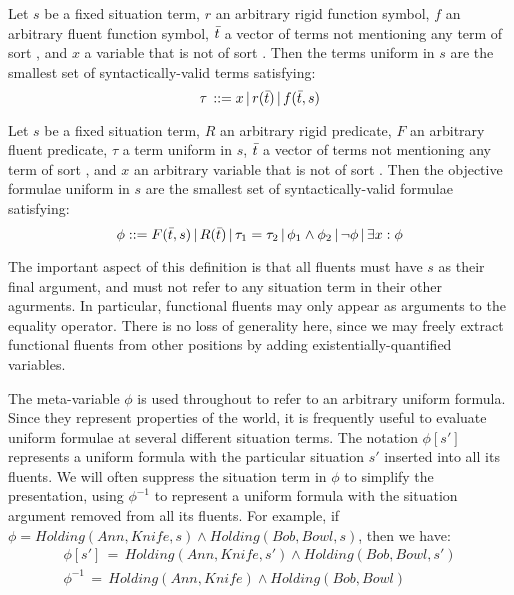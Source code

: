 \begin{defnL}
 Let $s$ be a fixed situation term, $r$
an arbitrary rigid function symbol, $f$ an arbitrary fluent function
symbol, $\bar{t}$ a vector of terms not mentioning any term of sort
, and $x$ a variable that is not of sort .
Then the terms uniform in $s$ are the smallest set of syntactically-valid
terms satisfying:\[
\tau\,::=x\,|\, r(\bar{t})\,|\, f(\bar{t},s)\]

\begin{defnL}
 Let $s$ be a fixed situation
term, $R$ an arbitrary rigid predicate, $F$ an arbitrary fluent
predicate, $\tau$ a term uniform in $s$, $\bar{t}$ a vector of
terms not mentioning any term of sort , and $x$ an
arbitrary variable that is not of sort . Then the
objective formulae uniform in $s$ are the smallest set of syntactically-valid
formulae satisfying:\[
\phi::=F(\bar{t},s)\,|\, R(\bar{t})\,|\,\tau_{1}=\tau_{2}\,|\,\phi_{1}\wedge\phi_{2}\,|\,\neg\phi\,|\,\exists x:\phi\]

\end{defnL}
\end{defnL}
The important aspect of this definition is that all fluents must have
$s$ as their final argument, and must not refer to any situation
term in their other agurments. In particular, functional fluents may
only appear as arguments to the equality operator. There is no loss
of generality here, since we may freely extract functional fluents
from other positions by adding existentially-quantified variables.

The meta-variable $\phi$ is used throughout to refer to an arbitrary
uniform formula. Since they represent properties of the world, it
is frequently useful to evaluate uniform formulae at several different
situation terms. The notation $\phi[s']$ represents a uniform formula
with the particular situation $s'$ inserted into all its fluents.
We will often suppress the situation term in $\phi$ to simplify the
presentation, using $\phi^{-1}$ to represent a uniform formula with
the situation argument removed from all its fluents. For example,
if $\phi=Holding(Ann,Knife,s)\wedge Holding(Bob,Bowl,s)$, then we
have:\begin{gather*}
\phi[s']\,=\, Holding(Ann,Knife,s')\wedge Holding(Bob,Bowl,s')\\
\phi^{-1}\,=\, Holding(Ann,Knife)\wedge Holding(Bob,Bowl)\end{gather*}


